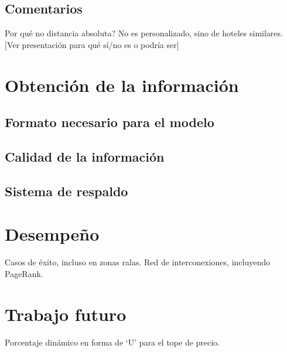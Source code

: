 \documentclass[12pt]{report}
\begin{document}
\section{Comentarios}
Por qué no distancia absoluta?
No es personalizado, sino de hoteles similares.
[Ver presentación para qué sí/no es o podría ser]

\chapter{Obtención de la información}
\section{Formato necesario para el modelo}
\section{Calidad de la información}
\section{Sistema de respaldo}

\chapter{Desempeño}
Casos de éxito, incluso en zonas ralas.
Red de interconexiones, incluyendo PageRank.

\chapter{Trabajo futuro}
Porcentaje dinámico en forma de `U' para el tope de precio.
\end{document}

